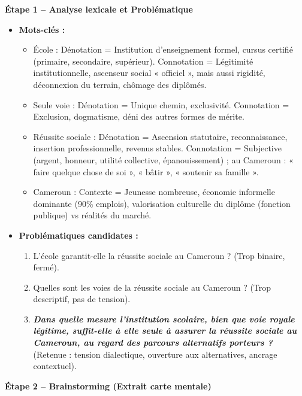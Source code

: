 \documentclass[11pt]{article}
\newcommand{\cle}[1]{{\popxbold\color{popdark}#1}}
\begin{document}
\begin{exoresolu}
\textbf{Étape 1 -- Analyse lexicale et Problématique}

\begin{itemize}
    \item \textbf{Mots-clés :}
    \begin{itemize}
        \item \cle{École} : Dénotation = Institution d'enseignement formel, cursus certifié (primaire, secondaire, supérieur). Connotation = Légitimité institutionnelle, ascenseur social « officiel », mais aussi rigidité, déconnexion du terrain, chômage des diplômés.
        \item \cle{Seule voie} : Dénotation = Unique chemin, exclusivité. Connotation = Exclusion, dogmatisme, déni des autres formes de mérite.
        \item \cle{Réussite sociale} : Dénotation = Ascension statutaire, reconnaissance, insertion professionnelle, revenus stables. Connotation = Subjective (argent, honneur, utilité collective, épanouissement) ; au Cameroun : « faire quelque chose de soi », « bâtir », « soutenir sa famille ».
        \item \cle{Cameroun} : Contexte = Jeunesse nombreuse, économie informelle dominante (90\% emplois), valorisation culturelle du diplôme (fonction publique) vs réalités du marché.
    \end{itemize}
    \item \textbf{Problématiques candidates :}
    \begin{enumerate}
        \item L'école garantit-elle la réussite sociale au Cameroun ? (Trop binaire, fermé).
        \item Quelles sont les voies de la réussite sociale au Cameroun ? (Trop descriptif, pas de tension).
        \item \textbf{\emph{Dans quelle mesure l'institution scolaire, bien que voie royale légitime, suffit-elle à elle seule à assurer la réussite sociale au Cameroun, au regard des parcours alternatifs porteurs ?}} (Retenue : tension dialectique, ouverture aux alternatives, ancrage contextuel).
    \end{enumerate}
\end{itemize}

\textbf{Étape 2 -- Brainstorming (Extrait carte mentale)}


\end{exoresolu}
\end{document}
